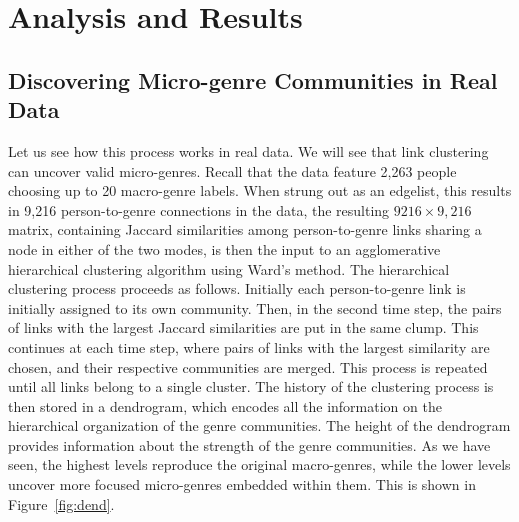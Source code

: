 \documentclass[a4paper,12pt]{extarticle}
\begin{document}
\section{Analysis and Results}
\subsection{Discovering Micro-genre Communities in Real Data}
Let us see how this process works in real data. We will see that link clustering can uncover valid micro-genres. Recall that the data feature 2,263 people choosing up to 20 macro-genre labels. When strung out as an edgelist, this results in 9,216 person-to-genre connections in the data, the resulting $9216 \times 9,216$ matrix, containing Jaccard similarities among person-to-genre links sharing a node in either of the two modes, is then the input to an agglomerative hierarchical clustering algorithm using Ward's \citep{ward63} method. The hierarchical clustering process proceeds as follows. Initially  each person-to-genre link is initially assigned to its own community. Then, in the second time step, the pairs of links with the largest Jaccard similarities are put in the same clump. This continues at each time step, where pairs of links with the largest similarity are chosen, and their respective communities are merged. This process is repeated until all links belong to a single cluster. The history of the clustering process is then stored in a dendrogram, which encodes all the information on the hierarchical organization of the genre communities. The height of the dendrogram provides information about the strength of the genre communities. As we have seen, the highest levels reproduce the original macro-genres, while the lower levels uncover more focused micro-genres embedded within them. This is shown in Figure~\ref{fig:dend}. 
\end{document}
